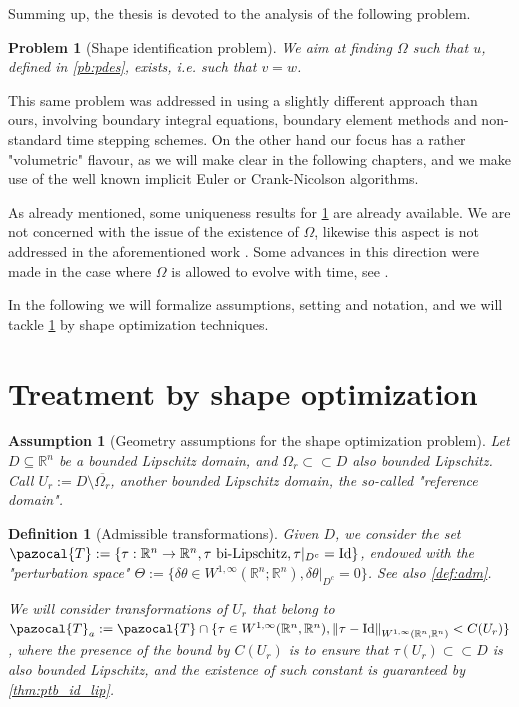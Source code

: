 \documentclass[english,a4paper,9pt,oneside]{scrbook}	%
\theoremstyle{break}
\newtheorem{defn}[equation]{Definition}
\newtheorem{ass}[equation]{Assumption}
\newtheorem{pb}[equation]{Problem}
\theoremstyle{remark}
\newcommand{\mR}{\mathbb{R}}
\newcommand{\norm}[1]{\left\lVert#1\right\rVert}
\newcommand{\cc}{\subset\subset}
\newcommand{\cT}{\pazocal{T}}
\newcommand{\id}{\text{Id}}
\newcommand{\te}{\theta}
\newcommand{\Te}{\Theta}
\begin{document}

Summing up, the thesis is devoted to the analysis of the following problem.

\begin{pb}[Shape identification problem]
\label{pb:shid}
We aim at finding $\Omega$ such that $u$, defined in \cref{pb:pdes}, exists, i.e. such that $v=w$.
\end{pb}

This same problem was addressed in \cite{harbrecht} using a slightly different approach than ours, involving boundary integral equations, boundary element methods and non-standard time stepping schemes. On the other hand our focus has a rather "volumetric" flavour, as we will make clear in the following chapters, and we make use of the well known implicit Euler or Crank-Nicolson algorithms.

As already mentioned, some uniqueness results for \cref{pb:shid} are already available. We are not concerned with the issue of the existence of $\Omega$, likewise this aspect is not addressed in the aforementioned work \cite{harbrecht}. Some advances in this direction were made in the case where $\Omega$ is allowed to evolve with time, see \cite{brugger}.

In the following we will formalize assumptions, setting and notation, and we will tackle \cref{pb:shid} by shape optimization techniques.

\section{Treatment by shape optimization}
\label{sec:shopt_treatment}

\begin{ass}[Geometry assumptions for the shape optimization problem]
\label{ass:geo_sh}
Let $D\subseteq \mR^n$ be a bounded Lipschitz domain, and $\Omega_r \cc D$ also bounded Lipschitz. Call $U_r:=D\setminus \overline{\Omega_r}$, another bounded Lipschitz domain, the so-called "reference domain".
\end{ass}

\begin{defn}[Admissible transformations]

Given $D$, we consider the set $\cT:=\{\tau:\mR^n\rightarrow\mR^n, \tau \text{ bi-Lipschitz}, \tau|_{D^c} = \id\}$, endowed with the "perturbation space" $\Te:=\{ \delta \te \in W^{1,\infty}(\mR^n;\mR^n), \delta \te|_{D^c}=0\}$. See also \cref{def:adm}.

We will consider transformations of $U_r$ that belong to $\cT_a:=\cT \cap \{ \tau \in W^{1,\infty}(\mR^n, \mR^n), \norm{\tau - \id}_{W^{1,\infty}(\mR^n, \mR^n)}<C(U_r)\}$, where the presence of the bound by $C(U_r)$ is to ensure that $\tau(U_r)\cc D$ is also bounded Lipschitz, and the existence of such constant is guaranteed by \cref{thm:ptb_id_lip}.


\end{defn}
\end{document}

